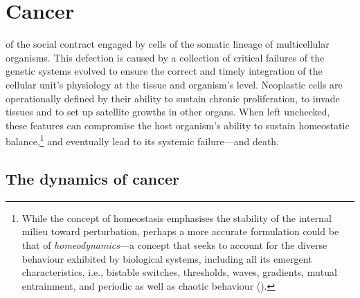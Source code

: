 \section{Cancer}


 of the social contract engaged by cells of the
somatic lineage of multicellular organisms.  This defection is caused by a
collection of critical failures of the genetic systems evolved to ensure the
correct and timely integration of the cellular unit's physiology at the tissue
and organism's level.  Neoplastic cells are operationally defined by their
ability to sustain chronic proliferation, to invade tissues and to set up
satellite growths in other organs.  When left unchecked, these features can
compromise the host organism's ability to sustain homeostatic
balance,\footnote{While the concept of homeostasis emphasises the stability of
  the internal milieu toward perturbation, perhaps a more accurate formulation
  could be that of \mbox{\emph{homeodynamics}}---a concept that seeks to account
  for the diverse behaviour exhibited by biological systems, including all its
  emergent characteristics, i.e., bistable switches, thresholds, waves,
  gradients, mutual entrainment, and periodic as well as chaotic behaviour
  (\citealp{lloyd_why_2001}).} and eventually lead to its systemic failure---and
death.

\bigskip



\subsection{The dynamics of cancer}
\label{sec:dynamics-cancer}

